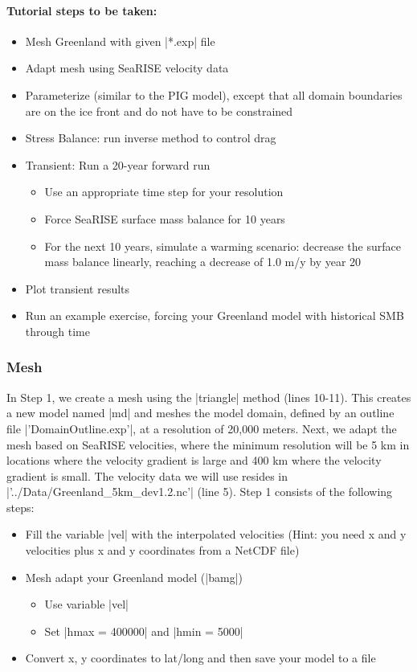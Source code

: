 \paragraph{Tutorial steps to be taken:}
\begin{itemize}
	\item Mesh Greenland with given \lstinlinebg|*.exp| file
	\item Adapt mesh using SeaRISE velocity data
	\item Parameterize (similar to the PIG model), except that all domain boundaries are on the ice front and do not have to be constrained
	\item Stress Balance: run inverse method to control drag
	\item Transient: Run a 20-year forward run
		\begin{itemize}
			\item Use an appropriate time step for your resolution
			\item Force SeaRISE surface mass balance for 10 years
			\item For the next 10 years, simulate a warming scenario: decrease the surface mass balance linearly, reaching a decrease of 1.0 m/y by year 20
		\end{itemize}
	\item Plot transient results
	\item Run an example exercise, forcing your Greenland model with historical SMB through time
\end{itemize}

\subsubsection{Mesh} %
In Step 1, we create a mesh using the \lstinlinebg|triangle| method (lines 10-11). This creates a new model named \lstinlinebg|md| and meshes the model domain, defined by an outline file \lstinlinebg|'DomainOutline.exp'|, at a resolution of 20,000 meters. Next, we adapt the mesh based on SeaRISE velocities, where the minimum resolution will be 5 km in locations where the velocity gradient is large and 400 km where the velocity gradient is small. The velocity data we will use resides in \lstinlinebg|'../Data/Greenland_5km_dev1.2.nc'| (line 5). Step 1 consists of the following steps:
\begin{itemize}
	\item Fill the variable \lstinlinebg|vel| with the interpolated velocities (Hint: you need x and y velocities plus x and y coordinates from a NetCDF file)
	\item Mesh adapt your Greenland model (\lstinlinebg|bamg|)
		\begin{itemize}
			\item Use variable \lstinlinebg|vel|
			\item Set \lstinlinebg|hmax = 400000| and \lstinlinebg|hmin = 5000|
		\end{itemize}
	\item Convert x, y coordinates to lat/long and then save your model to a file
\end{itemize}

